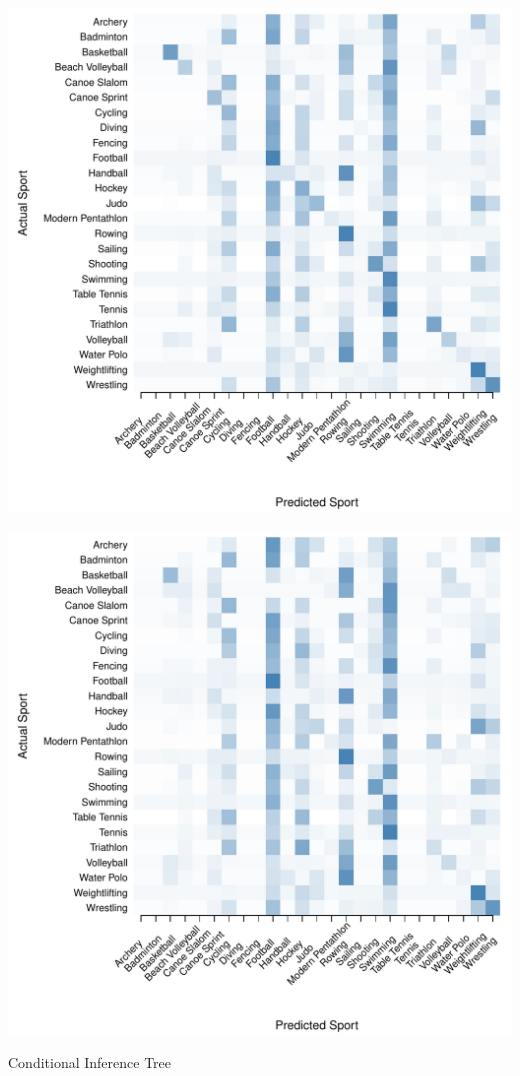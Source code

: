 \documentclass[landscape, paperwidth=42in, paperheight=36in,
fontscale=.35, margin=1in]{baposter}
\begin{document}
\begin{poster}
{\begin{center}
  \begin{minipage}{0.45\textwidth}
    \begin{center}
      \includegraphics[scale=0.27]{../graphics/sportCIT-trn.pdf}
    \end{center}
  \end{minipage}
  \hspace{0.05\textwidth}
  \begin{minipage}{0.45\textwidth}
    \begin{center}
      \includegraphics[scale=0.27]{../graphics/sportCIT-tst.pdf}
    \end{center}
  \end{minipage}
  Conditional Inference Tree \\




\end{center}}
\end{poster}
\end{document}
